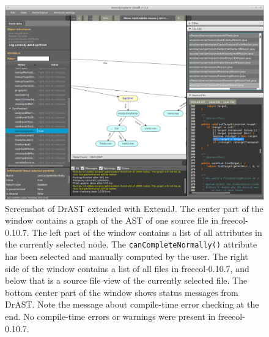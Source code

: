 {\begin{minipage}{\textwidth}
\begin{figure}[H]
  \includegraphics[width=1.0\textwidth]{figures/drast}
  \caption{
    Screenshot of DrAST extended with ExtendJ.
    The center part of the window contains a graph of the AST of one source file in
    freecol-0.10.7.
    The left part of the window contains a list of all attributes in the currently
    selected node. The \texttt{canCompleteNormally()} attribute has been selected and manually
    computed by the user.
    The right side of the window contains a list of all files in freecol-0.10.7,
    and below that is a source file view of the currently selected file.
    The bottom center part of the window shows status messages from DrAST. Note the
    message about compile-time error checking at the end.
    No compile-time errors or warnings were present in freecol-0.10.7.
  }
  \label{fig:screenshot1}
\end{figure}
\end{minipage}

}
